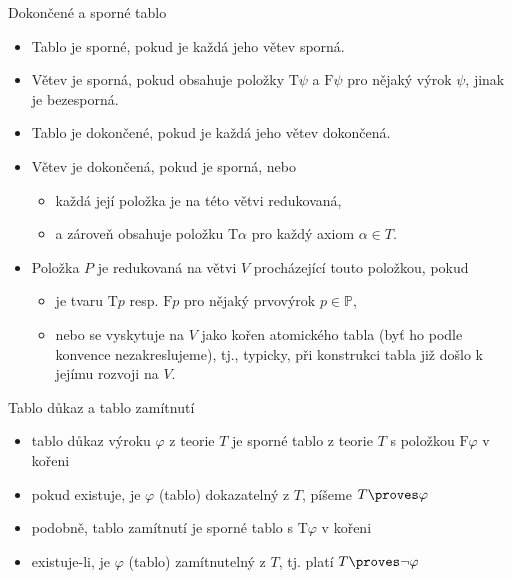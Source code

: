 \documentclass{beamer}
\begin{document}
\begin{frame}{Dokončené a sporné tablo}

    \begin{itemize}[<+->]
        \item Tablo je \alert{sporné}, pokud je každá jeho větev sporná.
        \item Větev je \alert{sporná}, pokud obsahuje položky $\mathrm{T}\psi$ a $\mathrm{F}\psi$ pro nějaký výrok $\psi$, jinak je \alert{bezesporná}.
        \item Tablo je \alert{dokončené}, pokud je každá jeho větev dokončená.
        \item Větev je \alert{dokončená}, pokud je sporná, nebo
        \begin{itemize}[<+->]
            \item každá její položka je na této větvi \alert{redukovaná},
            \item a zároveň obsahuje položku $\mathrm{T}\alpha$ pro každý axiom $\alpha\in T$.
        \end{itemize}
         
        \item Položka $P$ je \alert{redukovaná} na větvi $V$ procházející touto položkou, pokud 
        \begin{itemize}[<+->]
            \item je tvaru $\mathrm{T}p$ resp. $\mathrm{F}p$ pro nějaký prvovýrok $p\in\mathbb P$, 
            \item nebo se vyskytuje na $V$ jako kořen atomického tabla (byť ho podle konvence nezakreslujeme), tj., typicky, při konstrukci tabla již došlo k jejímu rozvoji na $V$.
        \end{itemize}
    \end{itemize}

\end{frame}


\begin{frame}{Tablo důkaz a tablo zamítnutí}

    \begin{itemize}[<+->]
        \item \alert{tablo důkaz} výroku $\varphi$ z teorie $T$ je \alert{sporné} tablo z teorie $T$ s položkou $\mathrm{F}\varphi$ v kořeni
        \item pokud existuje, je $\varphi$ \alert{(tablo) dokazatelný} z $T$, píšeme \alert{$T\proves\varphi$}
        \item podobně, \alert{tablo zamítnutí} je sporné tablo s $\mathrm{T}\varphi$ v kořeni
        \item existuje-li, je $\varphi$ \alert{(tablo) zamítnutelný} z $T$, tj. platí \alert{$T\proves\neg\varphi$}
    \end{itemize}

\end{frame}
\end{document}
